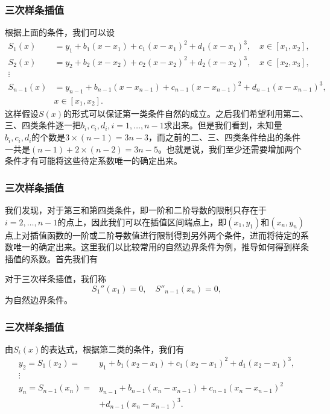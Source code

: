 \documentclass[10pt]{beamer}
\begin{document}
\begin{frame}
\frametitle{三次样条插值}
根据上面的条件，我们可以设
\begin{align}
\label{eq: cubic spline formulation}
S_1(x) &= y_1 + b_1(x-x_1) + c_1 (x-x_1)^2 + d_1 (x-x_1)^3, \quad x \in [x_1, x_2], \nonumber \\
S_2(x) &= y_2 + b_2(x-x_2) + c_2 (x-x_2)^2 + d_2 (x-x_2)^3, \quad x \in [x_2, x_3], \nonumber \\
\vdots \nonumber \\
S_{n-1}(x) &= y_{n-1} + b_{n-1}(x-x_{n-1}) + c_{n-1} (x-x_{n-1})^2 + d_{n-1} (x-x_{n-1})^3, \nonumber \\
\quad &x \in [x_1, x_2].
\end{align}
这样假设$S(x)$的形式可以保证第一类条件自然的成立。之后我们希望利用第二、三、四类条件逐一把$b_i, c_i, d_i, i = 1, \ldots, n-1$求出来。但是我们看到，未知量$b_i, c_i, d_i$的个数是$3 \times (n-1) = 3n - 3$，而之前的二、三、四类条件给出的条件一共是$(n-1) + 2 \times (n-2) = 3n - 5$。也就是说，我们至少还需要增加两个条件才有可能将这些待定系数唯一的确定出来。
\end{frame}


\begin{frame}
\frametitle{三次样条插值}
我们发现，对于第三和第四类条件，即一阶和二阶导数的限制只存在于$i = 2, \ldots, n-1$的点上，因此我们可以在插值区间端点上，即$(x_1, y_1)$和$(x_n, y_n)$点上对插值函数的一阶或二阶导数值进行限制得到另外两个条件，进而将待定的系数唯一的确定出来。这里我们以比较常用的自然边界条件为例，推导如何得到样条插值的系数。首先我们有

\begin{definition}[自然边界条件]
对于三次样条插值，我们称
\begin{equation}
S_1''(x_1) = 0, \quad S''_{n-1}(x_n) = 0,
\end{equation}
为自然边界条件。
\end{definition}
\end{frame}


\begin{frame}
\frametitle{三次样条插值}
由$S_i(x)$的表达式，根据第二类的条件，我们有
\begin{align}
\label{eq: cubic spline system 1-1}
y_2 = S_1(x_2) = &y_1 + b_1(x_2-x_1) + c_1(x_2-x_1)^2 + d_1 (x_2-x_1)^3, \nonumber \\
\vdots \nonumber \\
y_n = S_{n-1}(x_n) = &y_{n-1} + b_{n-1}(x_{n}-x_{n-1}) + c_{n-1}(x_{n}-x_{n-1})^2 \nonumber \\
                                    &+ d_{n-1} (x_{n}-x_{n-1})^3.
\end{align}
\end{frame}
\end{document}
